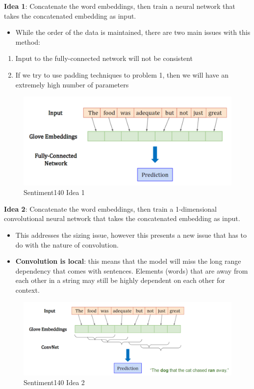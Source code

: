 \textbf{Idea 1}:
Concatenate the word embeddings, then train a neural network that takes the concatenated embedding as input.
\begin{itemize}
    \item While the order of the data is maintained, there are two main issues with this method:
\end{itemize}

\begin{enumerate}
    \item Input to the fully-connected network will not be consistent
    \item If we try to use padding techniques to problem 1, then we will have an extremely high number of parameters
\end{enumerate}

\begin{figure}[h!t]
    \centering
    \includegraphics[width=0.75\linewidth]{rnnidea1.png}
    \caption{Sentiment140 Idea 1}
    \label{fig:enter-label}
\end{figure}

\textbf{Idea 2}:
Concatenate the word embeddings, then train a 1-dimensional convolutional neural network that takes the concatenated embedding as input.
\begin{itemize}
\item This addresses the sizing issue, however this presents a new issue that has to do with the nature of convolution.
    \item \textbf{Convolution is local}: this means that the model will miss the long range dependency that comes with sentences. Elements (words) that are away from each other in a string may still be highly dependent on each other for context.
\end{itemize}

\begin{figure}[h!t]
    \centering
    \includegraphics[width=1\linewidth]{rnnidea2.png}
    \caption{Sentiment140 Idea 2}
    \label{fig:enter-label}
\end{figure}

